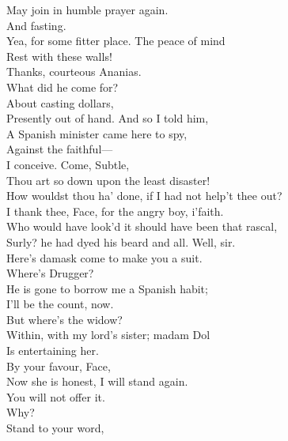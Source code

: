 \documentclass[a4paper,oneside]{memoir}
\begin{document}
\begin{drama*}
May join in humble prayer again.\\
\subtlespeaks {} And fasting.\\
\ananiasspeaks Yea, for some fitter place. The peace of mind\\
Rest with these walls!\\
\subtlespeaks {} Thanks, courteous Ananias.\\
\facespeaks What did he come for?\\
\subtlespeaks {} About casting dollars,\\
Presently out of hand. And so I told him,\\
A Spanish minister came here to spy,\\
Against the faithful---\\
\facespeaks {} I conceive. Come, Subtle,\\
Thou art so down upon the least disaster!\\
How wouldst thou ha' done, if I had not help't thee out?\\
\subtlespeaks I thank thee, Face, for the angry boy, i'faith.\\
\facespeaks Who would have look'd it should have been that rascal,\\
Surly? he had dyed his beard and all. Well, sir.\\
Here's damask come to make you a suit.\\
\subtlespeaks {} Where's Drugger?\\
\facespeaks He is gone to borrow me a Spanish habit;\\
I'll be the count, now.\\
\subtlespeaks {} But where's the widow?\\
\facespeaks Within, with my lord's sister; madam Dol\\
Is entertaining her.\\
\subtlespeaks {} By your favour, Face,\\
Now she is honest, I will stand again.\\
\facespeaks You will not offer it.\\
\subtlespeaks {} Why?\\
\facespeaks {} Stand to your word,\\

\end{drama*}
\end{document}
